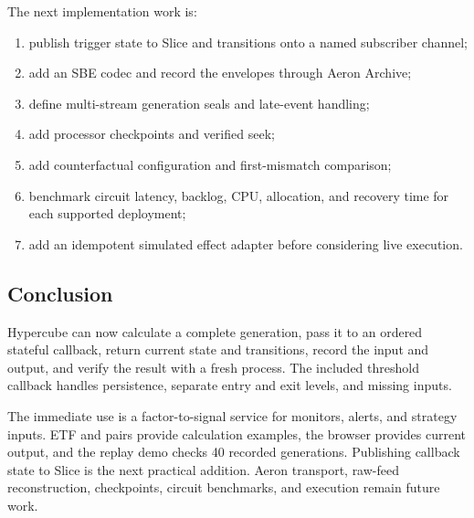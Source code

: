 \documentclass{strategynet-journal}
\newcommand{\SLICE}{\textsf{Slice}}
\begin{document}
\begin{SNcolumns}
The next implementation work is:
\begin{enumerate}
  \item publish trigger state to \SLICE{} and transitions onto a named
        subscriber channel;
  \item add an SBE codec and record the envelopes through Aeron Archive;
  \item define multi-stream generation seals and late-event handling;
  \item add processor checkpoints and verified seek;
  \item add counterfactual configuration and first-mismatch comparison;
  \item benchmark circuit latency, backlog, CPU, allocation, and recovery time
        for each supported deployment;
  \item add an idempotent simulated effect adapter before considering live
        execution.
\end{enumerate}

\subsection{Conclusion}

Hypercube can now calculate a complete generation, pass it to an ordered
stateful callback, return current state and transitions, record the input and
output, and verify the result with a fresh process.  The included threshold
callback handles persistence, separate entry and exit levels, and missing
inputs.

The immediate use is a factor-to-signal service for monitors, alerts, and
strategy inputs.  ETF and pairs provide calculation examples, the browser
provides current output, and the replay demo checks 40 recorded generations.
Publishing callback state to \SLICE{} is the next practical addition.  Aeron
transport, raw-feed reconstruction, checkpoints, circuit benchmarks, and
execution remain future work.

\end{SNcolumns}
\end{document}
